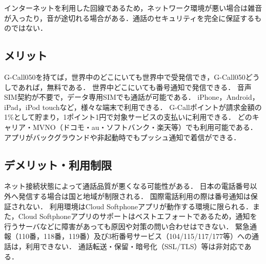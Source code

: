 \documentclass[a4paper,12pt]{article}
\begin{document}
インターネットを利用した回線であるため，ネットワーク環境が悪い場合は雑音が入ったり，音が途切れる場合がある．通話のセキュリティを完全に保証するものではない．

\subsection{メリット}

G-Call050を持てば，世界中のどこにいても世界中で受発信でき，G-Call050どうしであれば，無料である．
世界中どこにいても番号通知で発信できる．
音声SIM契約が不要で，データ専用SIMでも通話が可能である．
iPhone，Android，iPad，iPod touchなど，様々な端末で利用できる．
G-Callポイントが請求金額の1\%として貯まり，1ポイント1円で対象サービスの支払いに利用できる．
どのキャリア・MVNO（ドコモ・au・ソフトバンク・楽天等）でも利用可能である．
アプリがバックグラウンドや非起動時でもプッシュ通知で着信ができる．

\subsection{デメリット・利用制限}

ネット接続状態によって通話品質が悪くなる可能性がある．
日本の電話番号以外へ発信する場合は国と地域が制限される．
国際電話利用の際は番号通知は保証されない．
利用環境はCloud Softphoneアプリが動作する環境に限られる．また，Cloud Softphoneアプリのサポートはベストエフォートであるため，通知を行うサーバなどに障害があっても原因や対策の問い合わせはできない．
緊急通報（110番，118番，119番）及び3桁番号サービス（104/115/117/177等）への通話は，利用できない．
通話転送・保留・暗号化（SSL/TLS）等は非対応である．



\end{document}
